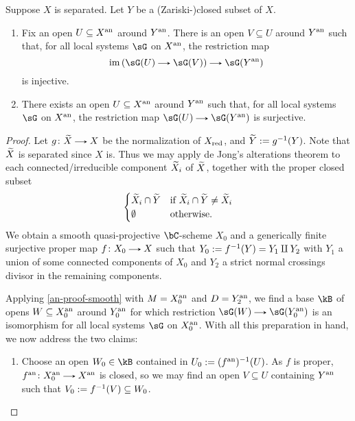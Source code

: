 \begin{nothing}
  \begin{sublemma}
    \label{an-proof-alter}
    Suppose $X$ is separated. Let $Y$ be a (Zariski-)closed subset of $X$.
    \begin{enumerate}
    \item \label{an-proof-alter-inj}
      Fix an open $U \subseteq X^{\mathrm{an}}$ around $Y^{\mathrm{an}}$. There is an open $V \subseteq U$ around $Y^{\mathrm{an}}$ such that, for all local systems $\sG$ on $X^{\mathrm{an}}$, the restriction map
      \[
        \im\l(\sG(U) \to \sG(V)\r) \to \sG(Y^\an)
      \]
      is injective.
    \item \label{an-proof-alter-surj}
      There exists an open $U \subseteq X^{\mathrm{an}}$ around $Y^{\mathrm{an}}$ such that, for all local systems $\sG$ on $X^{\mathrm{an}}$, the restriction map $\sG(U) \to \sG(Y^\an)$ is surjective.
    \end{enumerate}
    
    \begin{proof}
      Let $g \c \til{X} \to X$ be the normalization of $X_{\mathrm{red}}$, and $\widetilde{Y} \mathrel{:=} g^{-1}(Y)$. Note that $\widetilde{X}$ is separated since $X$ is. Thus we may apply de Jong's alterations theorem to each connected/irreducible component $\widetilde{X}_i$ of $\widetilde{X}$, together with the proper closed subset
      \[
        \begin{cases}
          \widetilde{X}_i \cap \widetilde{Y} & \text{if}\ \widetilde{X}_i \cap \widetilde{Y} \ne \widetilde{X}_i \\
          \emptyset & \text{otherwise}.
        \end{cases}
      \]
      We obtain a smooth quasi-projective $\bC$-scheme $X_0$ and a generically finite surjective proper map $f \c X_0 \to X$ such that $Y_0 \mathrel{:=} f^{-1}(Y) = Y_1 \amalg Y_2$ with $Y_1$ a union of some connected components of $X_0$ and $Y_2$ a strict normal crossings divisor in the remaining components.

      Applying \cref{an-proof-smooth} with $M = X_0^{\mathrm{an}}$ and $D = Y_2^{\mathrm{an}}$, we find a base $\kB$ of opens $W \subseteq X_0^{\mathrm{an}}$ around $Y_0^{\mathrm{an}}$ for which restriction $\sG(W) \to \sG(Y_0^\an)$ is an isomorphism for all local systems $\sG$ on $X_0^{\mathrm{an}}$. With all this preparation in hand, we now address the two claims:
      \begin{enumerate}[leftmargin=*]
      \item
        Choose an open $W_0 \in \kB$ contained in $U_0 \mathrel{:=} (f^{\mathrm{an}})^{-1}(U)$. As $f$ is proper, $f^\an \c X_0^\an \to X^\an$ is closed, so we may find an open $V \subseteq U$ containing $Y^{\mathrm{an}}$ such that $V_0 \mathrel{:=} f^{-1}(V) \subseteq W_0$.


\end{enumerate}
\end{proof}
\end{sublemma}
\end{nothing}
